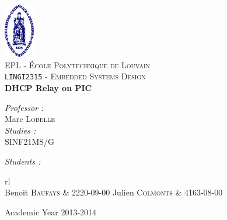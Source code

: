 \begin{titlepage}
 
\begin{center}
 
\vspace*{-2cm}\includegraphics[width=0.10\textwidth]{ucl.png}\\[1cm]
 
\textsc{\LARGE EPL - École Polytechnique de Louvain}\\[1.5cm]
 
\textsc{\Large \texttt{LINGI2315} - Embedded Systems Design}\\[0.5cm]
 
 
\vspace{1.0cm}
{ \huge \bfseries DHCP Relay on PIC\vspace{0.8cm}\\}
 
\vspace{1.0cm}
 
\begin{minipage}{0.4\textwidth}
\begin{flushleft} \large
\emph{Professor :}\\
	Marc \textsc{Lobelle}\\
\vspace{1cm}
\emph{Studies :}\\
	SINF21MS/G
\end{flushleft}
\end{minipage}
\begin{minipage}{0.4\textwidth}
\begin{flushright} \large
\emph{Students : } \\
\begin{tabular}{rl}\\
	Benoit \textsc{Baufays}	& {\footnotesize 2220-09-00} 
	Julien \textsc{Colmonts}	& {\footnotesize 4163-08-00} 
\end{tabular}
\end{flushright}
\end{minipage}
 
\vfill
 
\vspace{1.1cm}
{\large Academic Year 2013-2014}
\vspace{-1cm} 
\end{center}
 
\end{titlepage}
